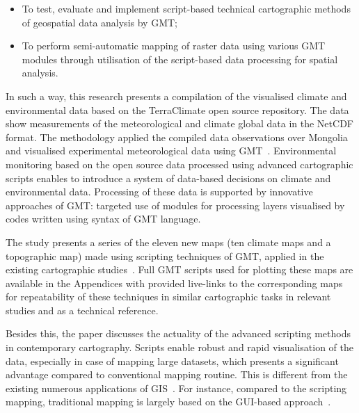 \documentclass[geosciences,article,accept,pdftex,oneauthor]{Definitions/mdpi}
\begin{document}
\begin{itemize}
	\item To test, evaluate and implement script-based technical cartographic methods of geospatial data analysis by GMT;
	\item	To perform semi-automatic mapping of raster data using various GMT modules through utilisation of the script-based data processing for spatial analysis.
\end{itemize}

In such a way, this research presents a compilation of the visualised climate and environmental data based on the TerraClimate open source repository. The data show measurements of the meteorological and climate global data in the NetCDF format. The methodology applied the compiled data observations over Mongolia and visualised experimental meteorological data using GMT~\cite{Wesseletal2019}. Environmental monitoring based on the open source data processed using advanced cartographic scripts enables to introduce a system of data-based decisions on climate and environmental data. Processing of these data is supported by innovative approaches of GMT: targeted use of modules for processing layers visualised by codes written using syntax of GMT language.

The study presents a series of the eleven new maps (ten climate maps and a topographic map) made using scripting techniques of GMT, applied in the existing cartographic studies~\cite{Lemenkova2019a,Kasalica,Lemenkova2021d,Spinellis,Lemenkova2021e,Virden}. Full GMT scripts used for plotting these maps are available in the Appendices with provided live-links to the corresponding maps for repeatability of these techniques in similar cartographic tasks in relevant studies and as a technical reference.

Besides this, the paper discusses the actuality of the advanced scripting methods in contemporary cartography. Scripts enable robust and rapid visualisation of the data, especially in case of mapping large datasets, which presents a significant advantage compared to conventional mapping routine. This is different from the existing numerous applications of GIS~\cite{TSUTSUMIDA2015196,Lemenkova2020c,Amarsaikhan,NAKAYAMA2021109404,Lemenkova2020d,PARK2019103630,OSULLIVAN2019101979}. For instance, compared to the scripting mapping, traditional mapping is largely based on the GUI-based approach~\cite{Tuvshin,Lemenkova2020e,Lemenkova2021f,HOLGUIN2018137}. 
\end{document}
